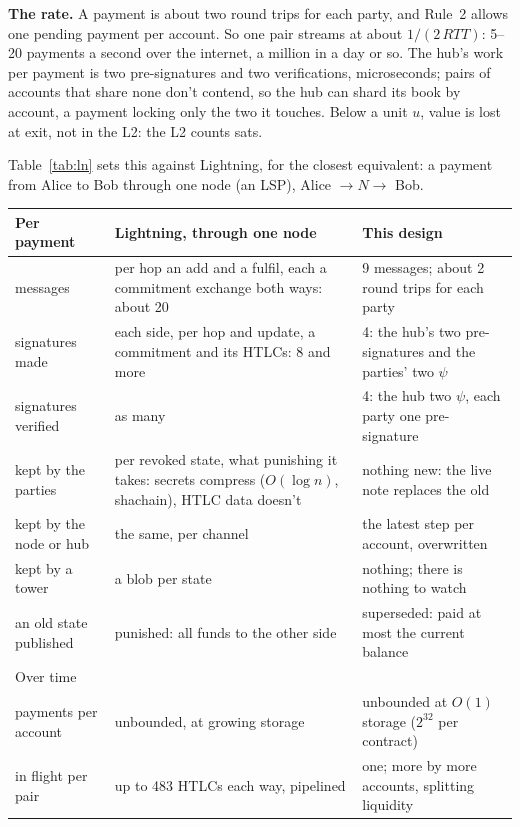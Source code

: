 \documentclass[11pt]{article}
\theoremstyle{plain}
\theoremstyle{definition}
\renewcommand{\arraystretch}{1.3}
\begin{document}
\textbf{The rate.} A payment is about two round trips for each party,
and Rule~2 allows one pending payment per account. So one pair streams
at about $1/(2\,\mathit{RTT})$: 5--20 payments a second over the
internet, a million in a day or so. The hub's work per payment is two
pre-signatures and two verifications, microseconds; pairs of accounts
that share none don't contend, so the hub can shard its book by
account, a payment locking only the two it touches. Below a unit $u$,
value is lost at exit, not in the L2: the L2 counts sats.

Table~\ref{tab:ln} sets this against Lightning, for the closest
equivalent: a payment from Alice to Bob through one node (an LSP),
Alice $\to N \to$ Bob.

\begin{table}[!tbp]
\centering\small
\renewcommand{\arraystretch}{1.15}
\begin{tabularx}{\linewidth}{>{\raggedright\arraybackslash}p{2.7cm}LL}
\toprule
Per payment & Lightning, through one node & This design \\
\midrule
messages & per hop an add and a fulfil, each a commitment exchange both ways: about 20 & 9 messages; about 2 round trips for each party \\
signatures made & each side, per hop and update, a commitment and its HTLCs: 8 and more & 4: the hub's two pre-signatures and the parties' two $\psi$ \\
signatures verified & as many & 4: the hub two $\psi$, each party one pre-signature \\
kept by the parties & per revoked state, what punishing it takes: secrets compress ($O(\log n)$, shachain), HTLC data doesn't & nothing new: the live note replaces the old \\
kept by the node or hub & the same, per channel & the latest step per account, overwritten \\
kept by a tower & a blob per state & nothing; there is nothing to watch \\
an old state published & punished: all funds to the other side & superseded: paid at most the current balance \\
\midrule
Over time & & \\
\midrule
payments per account & unbounded, at growing storage & unbounded at $O(1)$ storage ($2^{32}$ per contract) \\
in flight per pair & up to 483 HTLCs each way, pipelined & one; more by more accounts, splitting liquidity \\

\end{tabularx}
\end{table}
\end{document}

